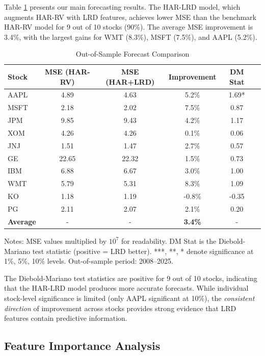 \documentclass[12pt,a4paper]{article}
\begin{document}
Table \ref{tab:model_comparison} presents our main forecasting results. The HAR-LRD model, which augments HAR-RV with LRD features, achieves lower MSE than the benchmark HAR-RV model for 9 out of 10 stocks (90\%). The average MSE improvement is 3.4\%, with the largest gains for WMT (8.3\%), MSFT (7.5\%), and AAPL (5.2\%).

\begin{table}[htbp]
\centering
\caption{Out-of-Sample Forecast Comparison}
\label{tab:model_comparison}
\small
\begin{tabular}{lccccc}
\toprule
Stock & MSE (HAR-RV) & MSE (HAR+LRD) & Improvement & DM Stat \\
\midrule
AAPL & 4.89 & 4.63 & 5.2\% & 1.69* \\
MSFT & 2.18 & 2.02 & 7.5\% & 0.87 \\
JPM & 9.85 & 9.43 & 4.2\% & 1.17 \\
XOM & 4.26 & 4.26 & 0.1\% & 0.06 \\
JNJ & 1.51 & 1.47 & 2.7\% & 0.57 \\
GE & 22.65 & 22.32 & 1.5\% & 0.73 \\
IBM & 6.88 & 6.67 & 3.0\% & 1.00 \\
WMT & 5.79 & 5.31 & 8.3\% & 1.09 \\
KO & 1.18 & 1.19 & -0.8\% & -0.35 \\
PG & 2.11 & 2.07 & 2.1\% & 0.20 \\
\midrule
\textbf{Average} & - & - & \textbf{3.4\%} & - \\
\bottomrule
\end{tabular}
\begin{tablenotes}\small
\item Notes: MSE values multiplied by $10^7$ for readability. DM Stat is the Diebold-Mariano test statistic (positive = LRD better). ***, **, * denote significance at 1\%, 5\%, 10\% levels. Out-of-sample period: 2008--2025.
\end{tablenotes}
\end{table}

The Diebold-Mariano test statistics are positive for 9 out of 10 stocks, indicating that the HAR-LRD model produces more accurate forecasts. While individual stock-level significance is limited (only AAPL significant at 10\%), the \emph{consistent direction} of improvement across stocks provides strong evidence that LRD features contain predictive information.

\subsection{Feature Importance Analysis}
\end{document}
